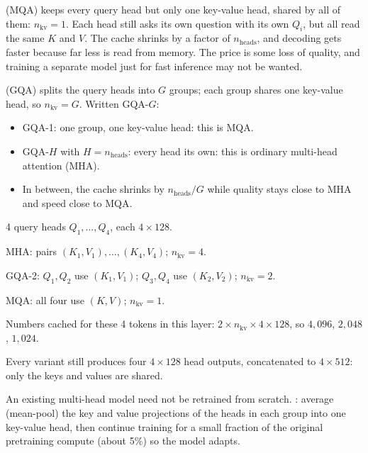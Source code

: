 \begin{definition}
 (MQA) keeps every query head but only one key-value head, shared by all of them: $n_{\text{kv}} = 1$. Each head still asks its own question with its own $Q_i$, but all read the same $K$ and $V$. The cache shrinks by a factor of $n_{\text{heads}}$, and decoding gets faster because far less is read from memory. The price is some loss of quality, and training a separate model just for fast inference may not be wanted.
\end{definition}

\begin{definition}
 (GQA) splits the query heads into $G$ groups; each group shares one key-value head, so $n_{\text{kv}} = G$. Written GQA-$G$:
\begin{itemize}
  \item GQA-1: one group, one key-value head: this is MQA.
  \item GQA-$H$ with $H = n_{\text{heads}}$: every head its own: this is ordinary multi-head attention (MHA).
  \item In between, the cache shrinks by $n_{\text{heads}}/G$ while quality stays close to MHA and speed close to MQA.
\end{itemize}
\end{definition}

\begin{example}
4 query heads $Q_1, \dots, Q_4$, each $4 \times 128$.
\begin{steps}
  \item MHA: pairs $(K_1, V_1), \dots, (K_4, V_4)$; $n_{\text{kv}} = 4$.
  \item GQA-2: $Q_1, Q_2$ use $(K_1, V_1)$; $Q_3, Q_4$ use $(K_2, V_2)$; $n_{\text{kv}} = 2$.
  \item MQA: all four use $(K, V)$; $n_{\text{kv}} = 1$.
  \item Numbers cached for these 4 tokens in this layer: $2 \times n_{\text{kv}} \times 4 \times 128$, so $4{,}096$, $2{,}048$, $1{,}024$.
\end{steps}
Every variant still produces four $4 \times 128$ head outputs, concatenated to $4 \times 512$: only the keys and values are shared.
\end{example}

\begin{definition}[Uptraining]
An existing multi-head model need not be retrained from scratch. : average (mean-pool) the key and value projections of the heads in each group into one key-value head, then continue training for a small fraction of the original pretraining compute (about 5\%) so the model adapts.
\end{definition}

